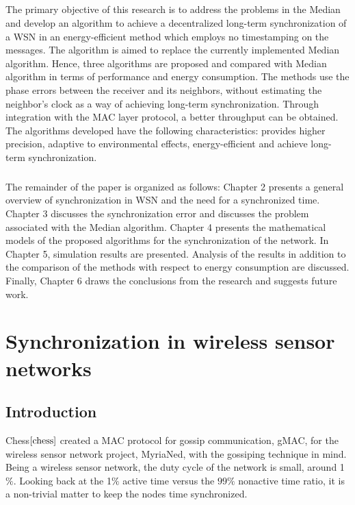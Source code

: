 \documentclass[a4paper,10pt]{report}
\begin{document}
\paragraph*{}
The primary objective of this research is to address the problems in the Median and develop an algorithm to achieve a decentralized long-term synchronization of a WSN in an energy-efficient method which employs no timestamping on the messages. The algorithm is aimed to replace the currently implemented Median algorithm.  Hence, three algorithms are proposed and compared with Median algorithm in terms of performance and energy consumption. The methods use the phase errors between the receiver and its neighbors, without estimating the neighbor's clock as a way of achieving long-term synchronization. Through integration with the MAC layer protocol, a better throughput can be obtained. The algorithms developed have the following characteristics: provides higher precision, adaptive to environmental effects, energy-efficient and achieve long-term synchronization.
\paragraph*{} The remainder of the paper is organized as follows:  Chapter 2 presents a general overview of synchronization in WSN and the need for a synchronized time. Chapter 3 discusses the synchronization error and discusses the problem associated with the Median algorithm. Chapter 4 presents the mathematical models of the proposed algorithms for the synchronization of the network. In Chapter 5, simulation results are presented. Analysis of the results in addition to the comparison of the methods with respect to energy consumption are discussed. Finally, Chapter 6 draws the conclusions from the research and suggests future work.
\chapter{\textbf{Synchronization in wireless sensor networks}}
\section{\textbf{Introduction}}
Chess$\cite{chess}$ created a MAC protocol for gossip communication, gMAC, for the wireless sensor network project, MyriaNed, with the gossiping technique in mind. Being a wireless sensor network, the duty cycle of the network is small, around 1$\%$. Looking back at the 1$\%$ active time versus the $99\%$ nonactive time ratio, it is a non-trivial matter to keep the nodes time synchronized.
\end{document}
